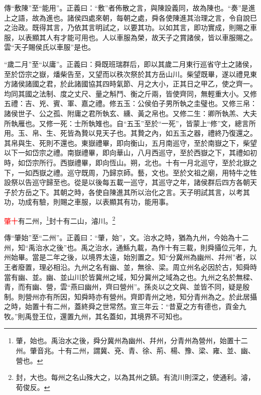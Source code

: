 {\noindent\zhuan{}\fzbyks 傳“敷陳”至“能用”。正義曰：“敷”者佈散之言，與陳設義同，故為陳也。“奏”是進上之語，故為進也。諸侯四處來朝，每朝之處，舜各使陳進其治理之言，令自說巳之治政。既得其言，乃依其言明試之，以要其功。以如其言，即功實成，則賜之車服，以表顯其人有才能可用也。人以車服為榮，故天子之賞諸侯，皆以車服賜之。雲“天子賜侯氏以車服”是也。 \par}

{\noindent\shu{}\fzkt “歲二月”至“以庸”。正義曰：舜既班瑞群后，即以其歲二月東行巡省守土之諸侯，至於岱宗之嶽，燔柴告至，又望而以秩次祭於其方岳山川。柴望既畢，遂以禮見東方諸侯諸國之君，於此諸國協其四時氣節、月之大小，正其日之甲乙，使之齊一。均同其國之法制、度之丈尺、量之斛鬥、衡之斤兩，皆使齊同，無輕重大小。又修五禮：吉、兇、賓、軍、嘉之禮。修五玉：公侯伯子男所執之圭璧也。又修三帛：諸侯世子、公之孤、附庸之君所執玄、纁、黃之帛也。又修二生：卿所執羔、大夫所執雁也。又修一死：士所執雉也。自“五玉”至於“一死”，皆蒙上“修”文，總言所用。玉、帛、生、死皆為贄以見天子也。其贄之內，如五玉之器，禮終乃復還之。其帛與生、死則不還也。東嶽禮畢，即向衡山，五月南巡守，至於南嶽之下，柴望以下一如岱宗之禮。南嶽禮畢，即向華山，八月西巡守，至於西嶽之下，其禮如初時，如岱宗所行。西嶽禮畢，即向恆山。朔，北也。十有一月北巡守，至於北嶽之下，一如西嶽之禮。巡守既周，乃歸京師。藝，文也。至於文祖之廟，用特牛之牲設祭以告巡守歸至也。從是以後每五載一巡守，其巡守之年，諸侯群后四方各朝天子於方岳之下。其朝之時，各使自陳進其所以治化之言。天子明試其言，以考其功，功成有驗，則賜之車服，以表顯其有功，能用事。 \par}

\textcolor{red}{肇十}有二州，\footnote{肇，始也。禹治水之後，舜分冀州為幽州、幷州，分青州為營州，始置十二州。肇音兆。十有二州，謂冀、兗、青、徐、荊、楊、豫、梁、雍、並、幽、營也。}封十有二山，濬川。\footnote{封，大也。每州之名山殊大之，以為其州之鎮。有流川則深之，使通利。濬，荀俊反。}

{\noindent\zhuan{}\fzbyks 傳“肇始”至“二州”。正義曰：“肇，始”，文。治水之時，猶為九州，今始為十二州，知“禹治水之後”也。禹之治水，通鯀九載，為作十有三載，則舜攝位元年，九州始畢。當是二年之後，以境界太遠，始別置之。知“分冀州為幽州、幷州”者，以王者廢置，理必相沿。九州之名有幽、並，無徐、梁。周立州名必因於古，知舜時當有幽、並。幽、並山川於皆冀州之域，知分冀州之域為之也。九州之名於無樑、青，而有幽、營，雲“燕曰幽州，齊曰營州”。孫炎以之文與、並皆不同，疑是殷制。則營州亦有所因，知舜時亦有營州。齊即青州之地，知分青州為之。於此居攝之時，始置十有二州，蓋終舜之世常然。宣三年云：“昔夏之方有德也，貢金九牧。”則禹登王位，還置九州，其名蓋如，其境界不可知也。 \par}

